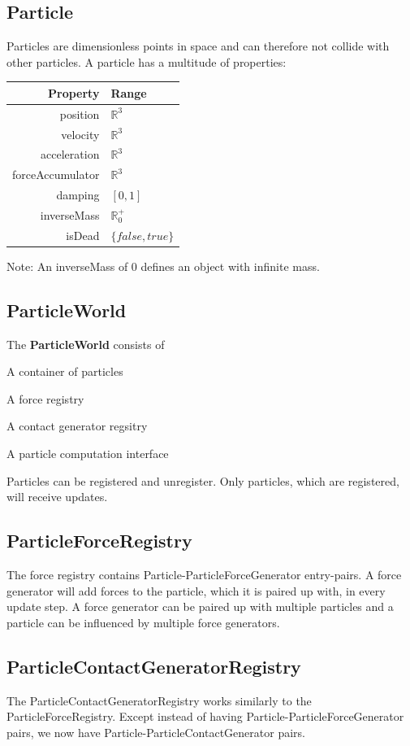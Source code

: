 \documentclass[12p, paper=a4, leqno, colorinlistoftodos]{article}
\newenvironment{packed_itemize}
{\begin{itemize}
		\setlength{\itemsep}{0pt}
		\setlength{\parskip}{0pt}
		\setlength{\parsep}{0pt}
	}{\end{itemize}}
\begin{document}
		\subsection{Particle}
		Particles are dimensionless points in space and can therefore not collide with other particles. A particle has a multitude of properties:
		
		\begin{tabular}[H]{r | l}
			Property & Range\\
			\hline
			position & $\mathbb{R}^3$\\
			velocity & $\mathbb{R}^3$\\
			acceleration & $\mathbb{R}^3$\\
			forceAccumulator & $\mathbb{R}^3$\\
			damping & $[0, 1]$\\
			inverseMass & $\mathbb{R}^+_0$\\
			isDead & $\{false, true\}$\\
		\end{tabular}
	
		Note: An inverseMass of 0 defines an object with infinite mass.
		
		\subsection{ParticleWorld}
		The \textbf{ParticleWorld} consists of
		\begin{packed_itemize}
			\item A container of particles
			\item A force registry
			\item A contact generator regsitry
			\item A particle computation interface
		\end{packed_itemize}
		Particles can be registered and unregister. Only particles, which are registered, will receive updates.
		
		\subsection{ParticleForceRegistry}
		The force registry contains Particle-ParticleForceGenerator entry-pairs. A force generator will add forces to the particle, which it is paired up with, in every update step. A force generator can be paired up with multiple particles and a particle can be influenced by multiple force generators.
		
		\subsection{ParticleContactGeneratorRegistry}
		The ParticleContactGeneratorRegistry works similarly to the ParticleForceRegistry. Except instead of having Particle-ParticleForceGenerator pairs, we now have Particle-ParticleContactGenerator pairs.
		
\end{document}
